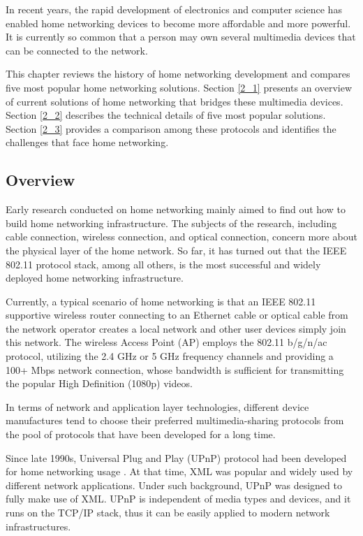 In recent years, the rapid development of electronics and computer science has
enabled home networking devices to become more affordable and more powerful. It
is currently so common that a person may own several multimedia devices that
can be connected to the network.

This chapter reviews the history of home networking development and compares
five most popular home networking solutions. Section \ref{2_1} presents an
overview of current solutions of home networking that bridges these multimedia
devices. Section \ref{2_2} describes the technical details of five most popular
solutions. Section \ref{2_3} provides a comparison among these protocols and
identifies the challenges that face home networking.
\subsection{Overview\label{2_1}} 
Early research \cite{link_layer_old} \cite{end_user} \cite{link_layer}
conducted on home networking mainly aimed to find out how to build home
networking infrastructure. The subjects of the research, including cable
connection, wireless connection, and optical connection, concern more about
the physical layer of the home network.  So far, it has turned out that the
IEEE 802.11 protocol stack, among all others, is the most successful and 
widely deployed home networking infrastructure.

Currently, a typical scenario of home networking is that an IEEE 802.11
supportive wireless router connecting to an Ethernet cable or optical cable from
the network operator creates a local network and other user devices simply join
this network. The wireless Access Point (AP) employs the 802.11 b/g/n/ac
protocol, utilizing the 2.4 GHz or 5 GHz frequency channels and providing a
100+ Mbps  network connection, whose bandwidth is sufficient for transmitting
the popular High Definition (1080p) videos.

In terms of network and application layer technologies, different device 
manufactures tend to choose their preferred multimedia-sharing protocols from
the pool of protocols that have been developed for a long time.

Since late 1990s, Universal Plug and Play (UPnP) protocol had been developed for
home networking usage \cite{upnp}. At that time, XML was popular and widely
used by different network applications. Under such background, UPnP was designed
to fully make use of XML. UPnP is independent of media types and devices, and it
runs on the TCP/IP stack, thus it can be easily applied to modern network
infrastructures.


